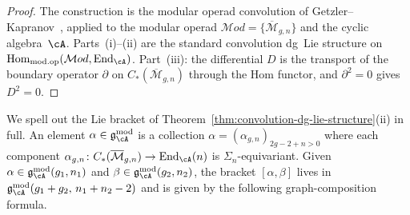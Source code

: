 \begin{proof}
The construction is the modular operad convolution of
Getzler--Kapranov~\cite[\S4--5]{GeK98}, applied to the modular
operad $\mathcal{M}od = \{\overline{\mathcal{M}}_{g,n}\}$ and
the cyclic algebra~$\cA$.  Parts~(i)--(ii) are the standard
convolution dg~Lie structure on
$\operatorname{Hom}_{\mathrm{mod.op}}(\mathcal{M}od,
\operatorname{End}_{\cA})$.  Part~(iii): the differential
$D$ is the transport of the boundary operator $\partial$ on
$C_*(\overline{\mathcal{M}}_{g,n})$ through the Hom functor,
and $\partial^2 = 0$ gives $D^2 = 0$.
\end{proof}

\begin{construction}
\label{const:explicit-convolution-bracket}
We spell out the Lie bracket of
Theorem~\ref{thm:convolution-dg-lie-structure}(ii) in full.
An element $\alpha \in \mathfrak{g}_{\cA}^{\mathrm{mod}}$ is a
collection
$\alpha = (\alpha_{g,n})_{2g-2+n>0}$ where each component
$\alpha_{g,n} \colon C_*(\overline{\mathcal{M}}_{g,n}) \to
\operatorname{End}_{\cA}(n)$ is $\Sigma_n$-equivariant.
Given
$\alpha \in \mathfrak{g}_{\cA}^{\mathrm{mod}}(g_1,n_1)$ and
$\beta \in \mathfrak{g}_{\cA}^{\mathrm{mod}}(g_2,n_2)$,
the bracket $[\alpha,\beta]$ lives in
$\mathfrak{g}_{\cA}^{\mathrm{mod}}(g_1+g_2,\, n_1+n_2-2)$ and is
given by the following graph-composition formula.


\end{construction}
